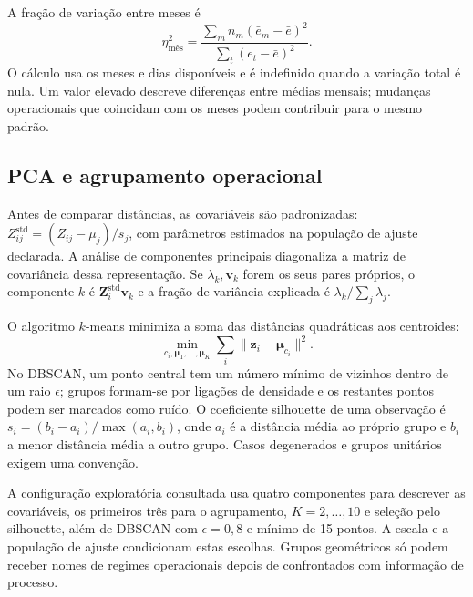 A fração de variação entre meses é
\begin{equation}
\eta^2_{\mathrm{mês}}=
\frac{\sum_m n_m(\bar e_m-\bar e)^2}{\sum_t(e_t-\bar e)^2}.
\label{eq:mat-eta}
\end{equation}
O cálculo usa os meses e dias disponíveis e é indefinido quando a variação total é nula. Um valor elevado descreve diferenças entre médias mensais; mudanças operacionais que coincidam com os meses podem contribuir para o mesmo padrão.

\subsection{PCA e agrupamento operacional}
\label{sec:mat-pca-clusters}
Antes de comparar distâncias, as covariáveis são padronizadas: $Z_{ij}^{\mathrm{std}}=(Z_{ij}-\mu_j)/s_j$, com parâmetros estimados na população de ajuste declarada. A análise de componentes principais diagonaliza a matriz de covariância dessa representação. Se $\lambda_k,\boldsymbol v_k$ forem os seus pares próprios, o componente $k$ é $\boldsymbol Z_i^{\mathrm{std}}\boldsymbol v_k$ e a fração de variância explicada é $\lambda_k/\sum_j\lambda_j$.

O algoritmo $k$-means minimiza a soma das distâncias quadráticas aos centroides:
\begin{equation}
\min_{c_i,\boldsymbol\mu_1,\ldots,\boldsymbol\mu_K}
\sum_i\|\boldsymbol z_i-\boldsymbol\mu_{c_i}\|^2.
\label{eq:mat-kmeans}
\end{equation}
No DBSCAN, um ponto central tem um número mínimo de vizinhos dentro de um raio $\epsilon$; grupos formam-se por ligações de densidade e os restantes pontos podem ser marcados como ruído. O coeficiente silhouette de uma observação é $s_i=(b_i-a_i)/\max(a_i,b_i)$, onde $a_i$ é a distância média ao próprio grupo e $b_i$ a menor distância média a outro grupo. Casos degenerados e grupos unitários exigem uma convenção.

A configuração exploratória consultada usa quatro componentes para descrever as covariáveis, os primeiros três para o agrupamento, $K=2,\ldots,10$ e seleção pelo silhouette, além de DBSCAN com $\epsilon=0{,}8$ e mínimo de 15 pontos. A escala e a população de ajuste condicionam estas escolhas. Grupos geométricos só podem receber nomes de regimes operacionais depois de confrontados com informação de processo.


